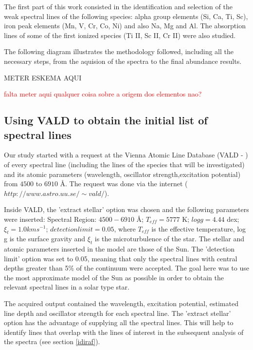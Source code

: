 \documentclass[dvips,12pt,a4paper]{report}
\begin{document}
{The first part of this work consisted in the identification and selection of the weak spectral lines of the following species: alpha group elements (Si, Ca, Ti, Sc), iron peak elements (Mn, V, Cr, Co, Ni) and also Na, Mg and Al. The absorption lines of some of the first ionized species (Ti II, Sc II, Cr II)  were also studied.

The following diagram illustrates the methodology followed, including all the necessary steps, from the aquision of the spectra to the final abundance results.

METER ESKEMA AQUI

\textcolor{red}{falta meter aqui qualquer coisa sobre a origem dos elementos nao?}

\subsection {Using VALD to obtain the initial list of spectral lines}
\label{VALD}
Our study started with a request at the Vienna Atomic Line Database (VALD - \citeauthor{Kupka-1999} \citeyear{Kupka-1999})  of every spectral line (including the lines of the species that will be investigated) and its atomic parameters (wavelength, oscillator strength,excitation potential) %
from $4500$ to $6910$ \AA. The request was done via the internet ($http://www.astro.uu.se/\sim vald/$). %

Inside VALD, the 'extract stellar' option was chosen and the following parameters were inserted: Spectral Region: $4500-6910$ \AA ; $T_{eff}=5777$ K; $log g=4.44$ dex; $\xi_t=1.0 kms^{-1}$; $detection limit=0.05$, where $T_{eff}$ is the effective temperature, log g is the surface gravity and $\xi_t$ is the microturbulence of the star. The stellar and atomic parameters inserted in the model are those of the Sun. The 'detection limit' option was set to 0.05, meaning that only the spectral lines with central depths greater than 5\% of the continuum were accepted. The goal here was to use the most approximate model of the Sun as possible in order to obtain the relevant spectral lines in a solar type star. 

The acquired output contained the wavelength, excitation potential, estimated line depth and oscillator strength for each spectral line. The 'extract stellar' option has the advantage of supplying all the spectral lines. This will help to identify lines that overlap with the lines of interest in the subsequent analysis of the spectra (see section \ref{idiraf}).

}
\end{document}
